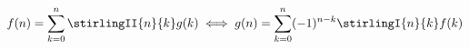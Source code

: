 \[
    f(n) = \sum_{k = 0}^n \stirlingII{n}{k} g(k) \iff g(n) = \sum_{k = 0}^n (-1)^{n - k} \stirlingI{n}{k} f(k)
\]
